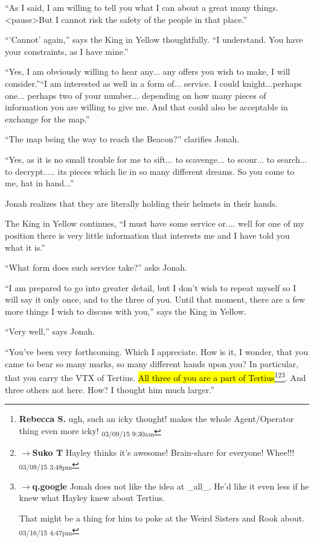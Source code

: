 ``As I said, I am willing to tell you what I can about a great many things. \textless pause\textgreater  But I cannot risk the safety of the people in that place.''

``'Cannot' again,'' says the King in Yellow thoughtfully.  ``I understand.  You have your constraints, as I have mine.''

``Yes, I am obviously willing to hear any... any offers you wish to make, I will consider.''``I am interested as well in a form of... service.  I could knight...perhaps one... perhaps two of your number... depending on how many pieces of information you are willing to give me.  And that could also be acceptable in exchange for the map.''

``The map being the way to reach the Beacon?'' clarifies Jonah.

``Yes, as it is no small trouble for me to sift... to scavenge... to scour... to search... to decrypt..... its pieces which lie in so many different dreams.  So you come to me, hat in hand...''

Jonah realizes that they are literally holding their helmets in their hands.

The King in Yellow continues, ``I must have some service or.... well for one of my position there is very little information that interests me and I have told you what it is.''

``What form does such service take?'' asks Jonah.

``I am prepared to go into greater detail, but I don't wish to repeat myself so I will say it only once, and to the three of you.  Until that moment, there are a few more things I wish to discuss with you,'' says the King in Yellow.

``Very well,'' says Jonah.

``You've been very forthcoming.  Which I appreciate.  How is it, I wonder, that you came to bear so many marks, so many different hands upon you?  In particular, that you carry the VTX of Tertius.  \hl{All three of you are a part of Tertius}\footnote{\textbf{Rebecca S. }ugh, such an icky thought! makes the whole Agent/Operator thing even more icky! \textsubscript{03/09/15 9:30am}}\footnote{$\rightarrow$\textbf{Suko T }Hayley thinks it's awesome!  Brain-share for everyone!  Whee!!! \textsubscript{03/09/15 3:48pm}}\footnote{$\rightarrow$\textbf{q.google }Jonah does not like the idea at \_all\_.  He'd like it even less if he knew what Hayley knew about Tertius.

That might be a thing for him to poke at the Weird Sisters and Rook about. \textsubscript{03/16/15 4:47pm}}.  And three others not here.  How?  I thought him much larger.''

